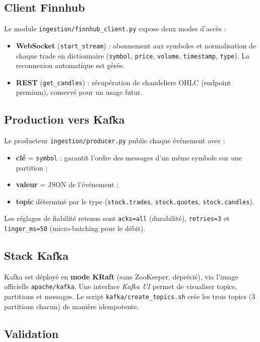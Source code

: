 \documentclass[11pt,a4paper]{article}
\newcommand{\code}[1]{\texttt{\small #1}}
\begin{document}
\subsection{Client Finnhub}

Le module \code{ingestion/finnhub\_client.py} expose deux modes d'accès :
\begin{itemize}
  \item \textbf{WebSocket} (\code{start\_stream}) : abonnement aux symboles et
        normalisation de chaque trade en dictionnaire
        (\code{symbol}, \code{price}, \code{volume}, \code{timestamp},
        \code{type}). La reconnexion automatique est gérée.
  \item \textbf{REST} (\code{get\_candles}) : récupération de chandeliers OHLC
        (endpoint premium), conservé pour un usage futur.
\end{itemize}

\subsection{Production vers Kafka}

Le producteur \code{ingestion/producer.py} publie chaque événement avec :
\begin{itemize}
  \item \textbf{clé} = \code{symbol} : garantit l'ordre des messages d'un même
        symbole sur une partition ;
  \item \textbf{valeur} = JSON de l'événement ;
  \item \textbf{topic} déterminé par le type (\code{stock.trades},
        \code{stock.quotes}, \code{stock.candles}).
\end{itemize}

Les réglages de fiabilité retenus sont \code{acks=all} (durabilité),
\code{retries=3} et \code{linger\_ms=50} (micro-batching pour le débit).

\subsection{Stack Kafka}

Kafka est déployé en \textbf{mode KRaft} (sans ZooKeeper, déprécié), via l'image
officielle \code{apache/kafka}. Une interface \emph{Kafka UI} permet de
visualiser topics, partitions et messages. Le script
\code{kafka/create\_topics.sh} crée les trois topics (3 partitions chacun) de
manière idempotente.

\subsection{Validation}
\end{document}
